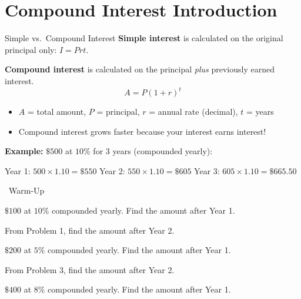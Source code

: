 \section{Compound Interest Introduction}

\begin{quickReview}{Simple vs.\ Compound Interest}
\textbf{Simple interest} is calculated on the original principal only: $I = Prt$.

\textbf{Compound interest} is calculated on the principal \emph{plus} previously earned interest.
$$A = P(1 + r)^t$$
\begin{itemize}[leftmargin=*]
    \item $A$ = total amount, $P$ = principal, $r$ = annual rate (decimal), $t$ = years
    \item Compound interest grows faster because your interest earns interest!
\end{itemize}

\medskip
\textbf{Example:} $\$500$ at $10\%$ for $3$ years (compounded yearly):

Year 1: $500 \times 1.10 = \$550$ \quad Year 2: $550 \times 1.10 = \$605$ \quad Year 3: $605 \times 1.10 = \$665.50$
\end{quickReview}

\begin{practiceBox}[funGreen]{\faSun~Warm-Up}


\prob $\$100$ at $10\%$ compounded yearly. Find the amount after Year 1. \answerBlank[3cm]

\prob From Problem 1, find the amount after Year 2. \answerBlank[3cm]

\prob $\$200$ at $5\%$ compounded yearly. Find the amount after Year 1. \answerBlank[3cm]

\prob From Problem 3, find the amount after Year 2. \answerBlank[3cm]

\prob $\$400$ at $8\%$ compounded yearly. Find the amount after Year 1. \answerBlank[3cm]
\end{practiceBox}

